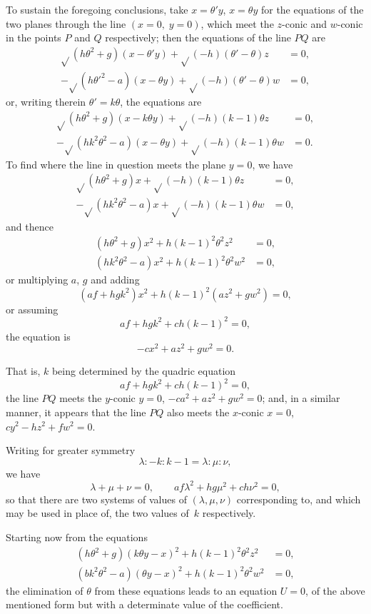 \documentclass[12pt,a4paper]{article}
\theoremstyle{plain}
\begin{document}
To sustain the foregoing conclusions, take $x = \theta'y$, $x = \theta y$ for the equations of the two planes through the line $(x=0,\; y=0)$, which meet the $z$-conic and $w$-conic in the points $P$ and $Q$ respectively; then the equations of the line $PQ$ are
\begin{align*}
\sqrt{}(h\theta^{2} + g)(x - \theta'y) + \sqrt{}(-h)(\theta' - \theta)z &= 0, \\
-\sqrt{}(h\theta'^{2} - a)(x - \theta y) + \sqrt{}(-h)(\theta' - \theta)w &= 0,
\end{align*}
or, writing therein $\theta' = k\theta$, the equations are
\begin{align*}
\sqrt{}(h\theta^{2} + g)(x - k\theta y) + \sqrt{}(-h)(k - 1)\theta z &= 0, \\
-\sqrt{}(hk^{2}\theta^{2} - a)(x - \theta y) + \sqrt{}(-h)(k - 1)\theta w &= 0.
\end{align*}
To find where the line in question meets the plane $y = 0$, we have
\begin{align*}
\sqrt{}(h\theta^{2} + g)x + \sqrt{}(-h)(k - 1)\theta z &= 0, \\
-\sqrt{}(hk^{2}\theta^{2} - a)x + \sqrt{}(-h)(k - 1)\theta w &= 0,
\end{align*}
and thence
\begin{align*}
(h\theta^{2} + g)x^{2} + h(k-1)^{2}\theta^{2}z^{2} &= 0, \\
(hk^{2}\theta^{2} - a)x^{2} + h(k-1)^{2}\theta^{2}w^{2} &= 0,
\end{align*}
or multiplying $a$, $g$ and adding
\[
(af + hgk^{2})x^{2} + h(k-1)^{2}(az^{2} + gw^{2}) = 0,
\]
or assuming
\[
af + hgk^{2} + ch(k-1)^{2} = 0,
\]
the equation is
\[
-cx^{2} + az^{2} + gw^{2} = 0.
\]

\newpage
\setcounter{page}{105}

That is, $k$ being determined by the quadric equation
\[
af + hgk^{2} + ch(k-1)^{2} = 0,
\]
the line $PQ$ meets the $y$-conic $y=0$, $-ca^{2} + az^{2} + gw^{2} = 0$; and, in a similar manner, it appears that the line $PQ$ also meets the $x$-conic $x=0$, $cy^{2} - hz^{2} + fw^{2} = 0$.

Writing for greater symmetry
\[
\lambda : -k : k-1 = \lambda : \mu : \nu,
\]
we have
\[
\lambda + \mu + \nu = 0, \qquad af\lambda^{2} + hg\mu^{2} + ch\nu^{2} = 0,
\]
so that there are two systems of values of $(\lambda, \mu, \nu)$ corresponding to, and which may be used in place of, the two values of~$k$ respectively.

Starting now from the equations
\begin{align*}
(h\theta^{2} + g)(k\theta y - x)^{2} + h(k-1)^{2}\theta^{2}z^{2} &= 0, \\
(bk^{2}\theta^{2} - a)(\theta y - x)^{2} + h(k-1)^{2}\theta^{2}w^{2} &= 0,
\end{align*}
the elimination of $\theta$ from these equations leads to an equation $U=0$, of the above mentioned form but with a determinate value of the coefficient.
\end{document}
